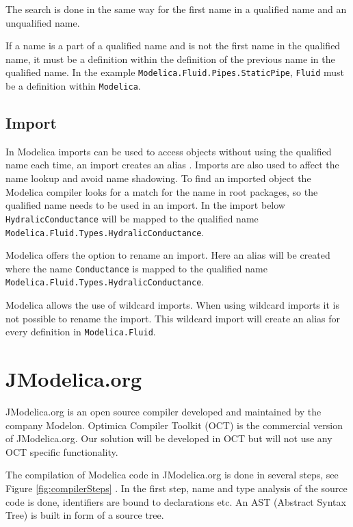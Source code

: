 \documentclass{cslthse-msc}
\begin{document}
The search is done in the same way for the first name in a qualified name and an unqualified name.

If a name is a part of a qualified name and is not the first name in the qualified name, it must be a definition within the definition of the previous name in the qualified name. In the example \texttt{Modelica.Fluid.Pipes.StaticPipe}, \texttt{Fluid} must be a definition within \texttt{Modelica}.

\subsection{Import}
In Modelica imports can be used to access objects without using the qualified name each time, an import creates an alias \cite{tillermodelica}. Imports are also used to affect the name lookup and avoid name shadowing. To find an imported object the Modelica compiler looks for a match for the name in root packages, so the qualified name needs to be used in an import. In the import below \texttt{HydralicConductance} will be mapped to the qualified name \texttt{Modelica.Fluid.Types.HydralicConductance}.



Modelica offers the option to rename an import. Here an alias will be created where the name \texttt{Conductance} is mapped to the qualified name \\\texttt{Modelica.Fluid.Types.HydralicConductance}.



Modelica allows the use of wildcard imports. When using wildcard imports it is not possible to rename the import. This wildcard import will create an alias for every definition in \texttt{Modelica.Fluid}.



\section{JModelica.org}
JModelica.org is an open source compiler developed and maintained by the company Modelon. Optimica Compiler Toolkit (OCT) is the commercial version of JModelica.org. Our solution will be developed in OCT but will not use any OCT specific functionality. 

The compilation of Modelica code in JModelica.org is done in several steps, see Figure \ref{fig:compilerSteps} \cite{aakesson2010implementation}. In the first step, name and type analysis of the source code is done, identifiers are bound to declarations etc. An AST (Abstract Syntax Tree) is built in form of a source tree.
\end{document}
